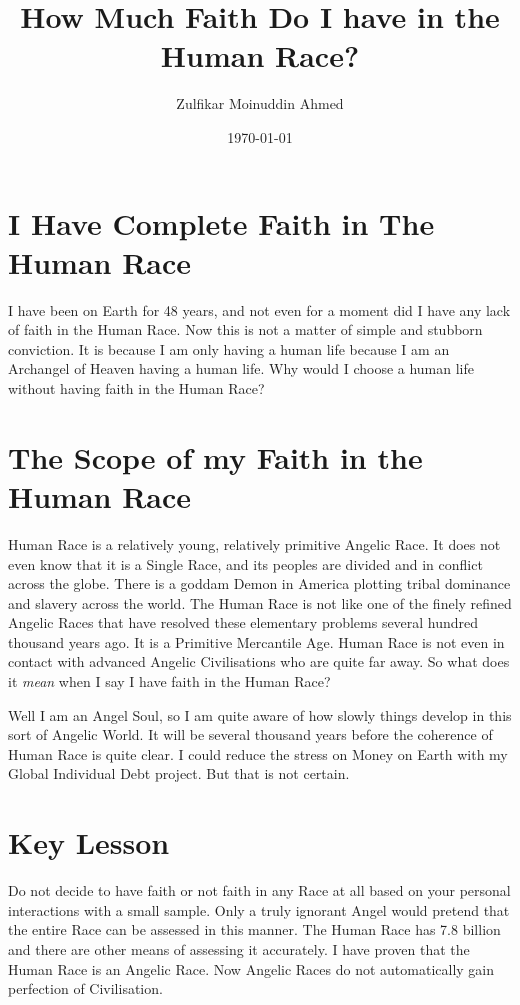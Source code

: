 \documentclass{amsart}
\title{How Much Faith Do I have in the Human Race?}
\author{Zulfikar Moinuddin Ahmed}
\date{\today}
\begin{document}
\maketitle


\section{I Have Complete Faith in The Human Race}

I have been on Earth for 48 years, and not even for a moment did I have any lack of faith in the Human Race.  Now this is not a matter of simple and stubborn conviction.  It is because I am only having a human life because I am an Archangel of Heaven having a human life.  Why would I choose a human life without having faith in the Human Race?

\section{The Scope of my Faith in the Human Race}

Human Race is a relatively young, relatively primitive Angelic Race.  It does not even know that it is a Single Race, and its peoples are divided and in conflict across the globe.  There is a goddam Demon in America plotting tribal dominance and slavery across the world.  The Human Race is not like one of the finely refined Angelic Races that have resolved these elementary problems several hundred thousand years ago.  It is a Primitive Mercantile Age.  Human Race is not even in contact with advanced Angelic Civilisations who are quite far away.  So what does it {\em mean} when I say I have faith in the Human Race?  

Well I am an Angel Soul, so I am quite aware of how slowly things develop in this sort of Angelic World.  It will be several thousand years before the coherence of Human Race is quite clear.  I could reduce the stress on Money on Earth with my Global Individual Debt project.  But that is not certain.

\section{Key Lesson}

Do not decide to have faith or not faith in any Race at all based on your personal interactions with a small sample.  Only a truly ignorant Angel would pretend that the entire Race can be assessed in this manner.  The Human Race has 7.8 billion and there are other means of assessing it accurately.  I have proven that the Human Race is an Angelic Race.  Now Angelic Races do not automatically gain perfection of Civilisation.  
\end{document}
